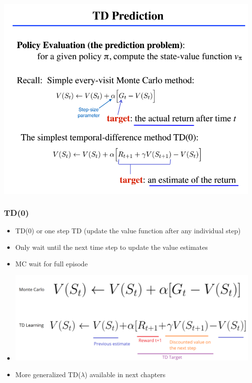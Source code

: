 \documentclass{beamer} %
\begin{document}
\begin{frame}
\includegraphics[height=\textheight, width=\textwidth]{tdPrediction.png}
\end{frame}

\begin{frame}
\frametitle{TD(0)}
\begin{itemize}
	\item  TD(0) or one step TD (update the value function after any individual step)
	\item  Only wait until the next time step to update the value estimates
	\item MC wait for full episode 
	\item \includegraphics[height=.2\textheight, width=.6\textwidth]{mcVtd.png}
	\item More generalized TD($\lambda$) available in next chapters
\end{itemize}
				
\end{frame}
\end{document}
